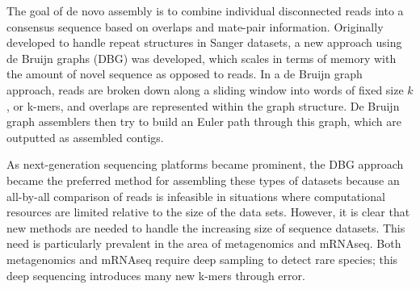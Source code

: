 \documentclass[12pt]{article} \usepackage{simplemargins}
\begin{document}
The goal of de novo assembly is to combine individual disconnected
reads into a consensus sequence based on overlaps and mate-pair
information.
Originally developed to 
handle repeat structures in Sanger datasets, a new approach using de Bruijn 
graphs (DBG) was developed\cite{pmid11504945}, which scales in terms of 
memory with the amount of novel sequence as opposed to reads.
In a de Bruijn
graph approach, reads are broken down along a sliding window into words of fixed
size $k$, or k-mers, and overlaps are represented within the graph 
structure.
De Bruijn graph assemblers then try to build an Euler path through
this graph, which are outputted as assembled contigs\cite{assemblyreview}.

As next-generation sequencing platforms became prominent, the DBG approach
became the preferred method for assembling these types of datasets
because an all-by-all comparison of reads is infeasible in situations where 
computational resources are limited relative to the size of the data 
sets.  However, it
is clear that new methods are needed to handle the
increasing size of sequence datasets. This need is
particularly prevalent in the area of metagenomics and mRNAseq.  Both
metagenomics and mRNAseq require deep sampling to detect rare species;
this deep sequencing introduces many new k-mers through error.
\end{document}

